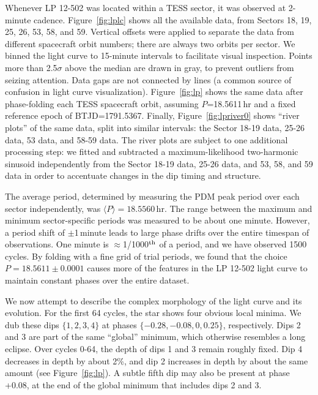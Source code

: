 \documentclass[11pt,twocolumn,tighten]{aastex63}
\begin{document}
Whenever LP 12-502 was located within a TESS sector, it was observed
at 2-minute cadence.  Figure~\ref{fig:lplc} shows all the available
data, from Sectors 18, 19, 25, 26, 53, 58, and 59. Vertical offsets
were applied to separate the data from different spacecraft orbit
numbers; there are always two orbits per sector.  We binned the light
curve to 15-minute intervals to facilitate visual inspection.  Points
more than 2.5$\sigma$ above the median are drawn in gray, to prevent
outliers from seizing attention.  Data gaps are not connected by lines
(a common source of confusion in light curve visualization).
Figure~\ref{fig:lp} shows the same data after phase-folding each TESS
spacecraft orbit, assuming $P$=18.5611\,hr and a fixed reference epoch
of BTJD=1791.5367.  Finally, Figure~\ref{fig:lpriver0} shows ``river
plots'' of the same data, split into similar intervals: the Sector
18-19 data, 25-26 data, 53 data, and 58-59 data.  The river plots are
subject to one additional processing step: we fitted and subtracted a
maximum-likelihood two-harmonic sinusoid independently from the Sector
18-19 data, 25-26 data, and 53, 58, and 59 data in order to accentuate
changes in the dip timing and structure.

The average period, determined by measuring the PDM peak period over
each sector independently, was $\langle P \rangle = 18.5560$\,hr.  The
range between the maximum and minimum sector-specific periods was
measured to be about one minute.   However, a period shift of
$\pm$1\,minute leads to large phase drifts over the entire timespan of
observations.  One minute is $\approx$1/1000$^{\rm th}$ of a period,
and we have observed 1500 cycles.  By folding with a fine grid of
trial periods, we found that the choice $P=18.5611 \pm 0.0001$ causes
more of the features in the LP 12-502 light curve to maintain constant
phases over the entire dataset.

We now attempt to describe the complex morphology of the light curve
and its evolution.  For the first 64 cycles, the star shows four
obvious local minima.  We dub these dips $\{ 1, 2, 3, 4 \}$ at phases
$\{ -0.28, -0.08, 0, 0.25 \}$, respectively.  Dips 2 and 3 are part of
the same ``global'' minimum, which otherwise resembles a long eclipse.
Over cycles 0-64, the depth of dips 1 and 3 remain roughly fixed.  Dip
4 decreases in depth by about 2\%, and dip 2 increases in depth by
about the same amount (see Figure~\ref{fig:lp}).  A subtle fifth dip
may also be present at phase +0.08, at the end of the global minimum
that includes dips 2 and 3.
\end{document}

